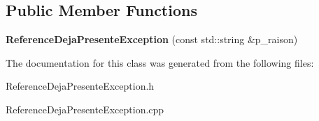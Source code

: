 \subsection*{Public Member Functions}
\begin{DoxyCompactItemize}
\item 
\hypertarget{classtp_1_1ReferenceDejaPresenteException_af9f1bc5c47b3519182bdbdf4bc84e247}{}{\bfseries Reference\+Deja\+Presente\+Exception} (const std\+::string \&p\+\_\+raison)\label{classtp_1_1ReferenceDejaPresenteException_af9f1bc5c47b3519182bdbdf4bc84e247}

\end{DoxyCompactItemize}


The documentation for this class was generated from the following files\+:\begin{DoxyCompactItemize}
\item 
Reference\+Deja\+Presente\+Exception.\+h\item 
Reference\+Deja\+Presente\+Exception.\+cpp\end{DoxyCompactItemize}
